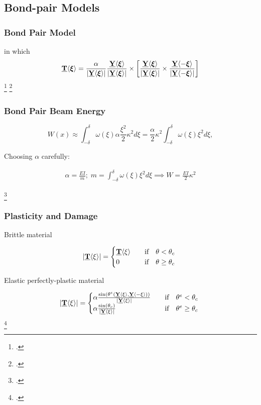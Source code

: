 \subsection{Bond-pair Models}
%
\begin{frame}
\frametitle{Bond Pair Model}
%
\begin{figure}
\end{figure}
%
in which
%
\begin{equation*}
\vstate{T}{}{\boldsymbol{\xi}} =\frac{\alpha}{|\vstate{Y}{}{\boldsymbol{\xi}}|} \frac{\vstate{Y}{}{\boldsymbol{\xi}}}{|\vstate{Y}{}{\boldsymbol{\xi}}|} \times \left[\frac{\vstate{Y}{}{\boldsymbol{\xi}}}{|\vstate{Y}{}{\boldsymbol{\xi}}|} \times \frac{\vstate{Y}{}{-\boldsymbol{\xi}}}{|\vstate{Y}{}{-\boldsymbol{\xi}}|}\right]
\end{equation*}
%
\footcite{silling:psa}
\footcite{jogrady2014a}
%
\end{frame}
%
%
\begin{frame}
  \frametitle{Bond Pair Beam Energy}
\vfill

\begin{equation*}
W(x) \approx \int_{-\delta}^\delta \omega(\xi)\alpha\frac{\xi^2}{2}\kappa^2 d\xi = \frac{\alpha}{2}\kappa^2 \int_{-\delta}^\delta \omega(\xi)\xi^2 d\xi,
\end{equation*}
%
\vspace{0.5cm}
\begin{center}
Choosing \(\alpha\) carefully:
\end{center}
%
\begin{align*}
\alpha = \frac{EI}{m} ;\; m=\int_{-\delta}^\delta \omega(\xi)\xi^2 d\xi \implies W=\frac{EI}{2}\kappa^2
\end{align*}
%

\footcite{jogrady2014a}
\end{frame}
%
%
\begin{frame}
  \frametitle{Plasticity and Damage}

  
  \begin{center}
      Brittle material
  \end{center}
  
\[ 
|\vstate{T}{}{\xi}| = 
  \begin{cases}
    \vstate{T}{}{\xi} & \quad \text{if} \quad \theta < \theta_c \\
    0 & \quad \text{if} \quad \theta \geq \theta_c\
  \end{cases}
\]

  \begin{center}
     Elastic perfectly-plastic material \\
  \end{center}

\[ 
|\vstate{T}{}{\xi}| = 
  \begin{cases}
    \alpha \frac{\sin(\theta^e(\vstate{Y}{}{\xi},\vstate{Y}{}{\mathbf{-\xi}}))}{|\vstate{Y}{}{\xi}|} & \quad \text{if} \quad \theta^e < \theta_c\\
    \alpha \frac{\sin(\theta_c)}{|\vstate{Y}{}{\xi}|} & \quad \text{if} \quad \theta^e \geq \theta_c\
  \end{cases}
\]
%
\footcite{jogrady2014a}
\end{frame}
